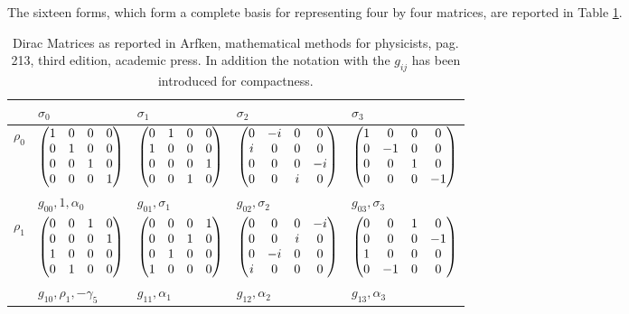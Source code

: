 \documentclass[10pt]{beamer}
\begin{document}
\begin{frame}[shrink=20]{}
The sixteen forms, which form a complete basis for representing four by four matrices, are reported in Table \ref{Dirac_Matrices}.

\begin{table}[]
\centering
\caption{Dirac Matrices as reported in Arfken, mathematical methods for physicists, pag. 213, third edition, academic press. In addition the notation with the $g_{ij}$ has been introduced for compactness.}
\label{Dirac_Matrices}
\begin{tabular}{l l  l  l  l }
\hline
& $\sigma_0$ & $\sigma_1$  & $\sigma_2$ & $\sigma_3$ \\
\hline
$\rho_0$ & $\begin{pmatrix}1 & 0 & 0 & 0\cr 0 & 1 & 0 & 0\cr 0 & 0 & 1 & 0\cr 0 & 0 & 0 & 1\end{pmatrix}$  
& $\begin{pmatrix}0 & 1 & 0 & 0\cr 1 & 0 & 0 & 0\cr 0 & 0 & 0 & 1\cr 0 & 0 & 1 & 0\end{pmatrix}$ 
& $\begin{pmatrix}0 & -i & 0 & 0\cr i & 0 & 0 & 0\cr 0 & 0 & 0 & -i\cr 0 & 0 & i & 0\end{pmatrix}$ 
& $\begin{pmatrix}1 & 0 & 0 & 0\cr 0 & -1 & 0 & 0\cr 0 & 0 & 1 & 0\cr 0 & 0 & 0 & -1\end{pmatrix}$ \\
 & $g_{00}, 1, \alpha_0$ & $g_{01}, \sigma_1$  & $g_{02}, \sigma_2$ & $g_{03}, \sigma_3$ \\
\hline
$\rho_1$ &$\begin{pmatrix}0 & 0 & 1 & 0\cr 0 & 0 & 0 & 1\cr 1 & 0 & 0 & 0\cr 0 & 1 & 0 & 0\end{pmatrix}$  
& $\begin{pmatrix}0 & 0 & 0 & 1\cr 0 & 0 & 1 & 0\cr 0 & 1 & 0 & 0\cr 1 & 0 & 0 & 0\end{pmatrix}$ 
& $\begin{pmatrix}0 & 0 & 0 & -i\cr 0 & 0 & i & 0\cr 0 & -i & 0 & 0\cr i & 0 & 0 & 0\end{pmatrix}$ 
& $\begin{pmatrix}0 & 0 & 1 & 0\cr 0 & 0 & 0 & -1\cr 1 & 0 & 0 & 0\cr 0 & -1 & 0 & 0\end{pmatrix}$ \\
& $g_{10}, \rho_1, -\gamma_5$  & $g_{11}, \alpha_1$  & $g_{12},\alpha_2$ & $g_{13}, \alpha_3$ \\

\end{tabular}
\end{table}
\end{frame}
\end{document}
